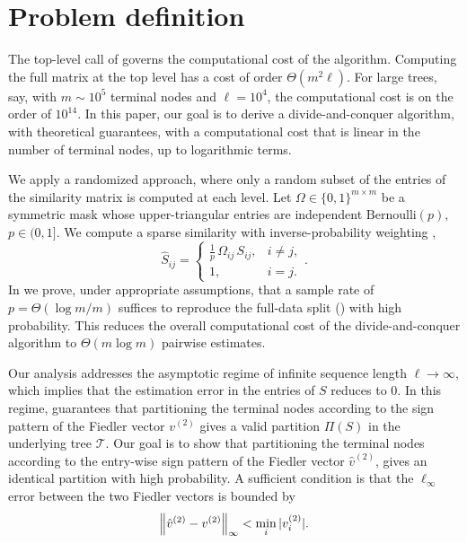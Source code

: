 \section{Problem definition}\label{sec:problem}

The top-level call of  governs the computational cost of the algorithm.
Computing the full matrix at the top level has a cost of order $\Theta(m^2\ell)$. For large trees, say, with
$m \sim 10^5$ terminal nodes and $\ell = 10^4$, the computational cost is on the order of $10^{14}$. 
In this paper, our goal is to derive a divide-and-conquer algorithm, with theoretical guarantees, with a computational cost that is linear in the number of terminal nodes, up to logarithmic terms. 

We apply a randomized approach, where only a random subset of the entries of the similarity matrix is computed at each level. 
Let $\Omega\in\{0,1\}^{m\times m}$ be a symmetric mask whose upper-triangular entries are
independent $\mathrm{Bernoulli}(p)$, $p\in(0,1]$. We compute a sparse similarity with
inverse-probability weighting \cite{candes2009matrix},
\begin{equation}\label{eq:sampling_estimator}
   \hat S_{ij}=\begin{cases}\tfrac1p\,\Omega_{ij}\,S_{ij}, & i\ne j,\\ 1, & i=j.\end{cases}.
\end{equation}
In  we prove, under appropriate assumptions, that a sample rate of $p=\Theta(\log m/m)$ suffices to reproduce the full-data split () with high probability. This reduces the overall computational cost of the divide-and-conquer algorithm to 
$\Theta(m\log m)$ pairwise estimates.


Our analysis addresses the asymptotic regime of infinite sequence length $\ell \to \infty$, which implies that the estimation error in the entries of $S$ reduces to $0$.
In this regime,  guarantees that partitioning the terminal nodes according to the sign pattern of the Fiedler vector $v^{(2)}$ gives a valid partition $\Pi(S)$ in the underlying tree $\mathcal T$.
Our goal is to show that partitioning the terminal nodes according to the entry-wise sign pattern of the Fiedler vector $\hat v^{(2)}$, gives an identical partition with high probability. 
A sufficient condition is that the $\ell_{\infty}$ error between the two Fiedler vectors is bounded by 
\begin{equation}\label{eq:entrywise}
   \left\lVert \hat v^{(2)}-v^{(2)} \right\rVert_\infty<\min_i|v^{(2)}_i|.
\end{equation}


